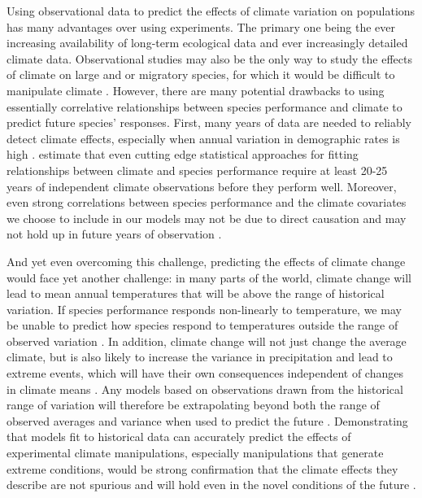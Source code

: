 \documentclass[11pt]{article}
\begin{document}
\begin{doublespacing}
Using observational data to predict the effects of climate variation on populations has many advantages over using experiments. The primary one being the ever increasing availability of long-term ecological data and ever increasingly detailed climate data. Observational studies may also be the only way to study the effects of climate on large and or migratory species, for which it would be difficult to manipulate climate \citep{koons_climate_2012,jenouvrier_demographic_2009,aubry_climate_2013}. However, there are many potential drawbacks to using essentially correlative relationships between species performance and climate to predict future species' responses. First, many years of data are needed to reliably detect climate effects, especially when annual variation in demographic rates is high \citep{teller_linking_2016,gerber_optimal_2015}. \citep{teller_linking_2016} estimate that even cutting edge statistical approaches for fitting relationships between climate and species performance require at least 20-25 years of independent climate observations before they perform well. Moreover, even strong correlations between species performance and the climate covariates we choose to include in our models may not be due to direct causation and may not hold up in future years of observation \citep{hilborn_correlation_2016}. 

And yet even overcoming this challenge, predicting the effects of climate change would face yet another challenge: in many parts of the world, climate change will lead to mean annual temperatures that will be above the range of historical variation. If species performance responds non-linearly to temperature, we may be unable to predict how species respond to temperatures outside the range of observed variation \citep{doak_demographic_2010}. In addition, climate change will not just change the average climate, but is also likely to increase the variance in precipitation and lead to extreme events, which will have their own consequences independent of changes in climate means \citep{gherardi_enhanced_2015,jentsch_new_2007}. Any models based on observations drawn from the historical range of variation will therefore be extrapolating beyond both the range of observed averages and variance when used to predict the future \citep{williams_novel_2007}. Demonstrating that models fit to historical data can accurately predict the effects of experimental climate manipulations, especially manipulations that generate extreme conditions, would be strong confirmation that the climate effects they describe are not spurious and will hold even in the novel conditions of the future \cite{adler_can_2013}.  


\end{doublespacing}
\end{document}
